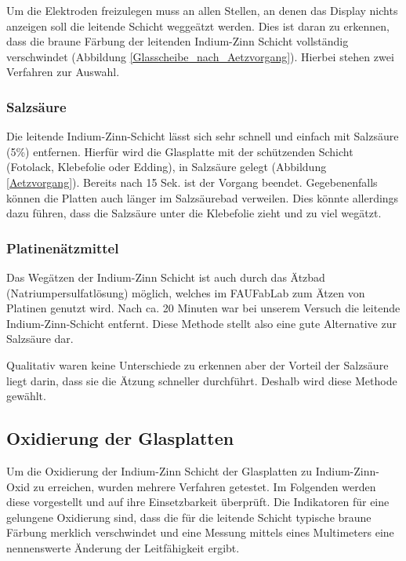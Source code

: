Um die Elektroden freizulegen muss an allen Stellen, an denen das Display nichts anzeigen soll die leitende Schicht weggeätzt werden. Dies ist daran zu erkennen, dass die braune Färbung der leitenden Indium-Zinn Schicht vollständig verschwindet (Abbildung \ref{Glasscheibe_nach_Aetzvorgang}). Hierbei stehen zwei Verfahren zur Auswahl.\\

\subsubsection*{Salzsäure}

Die leitende Indium-Zinn-Schicht lässt sich sehr schnell und einfach mit Salzsäure (5\%) entfernen. Hierfür wird die Glasplatte mit der schützenden Schicht (Fotolack, Klebefolie oder Edding), in Salzsäure gelegt (Abbildung \ref{Aetzvorgang}). Bereits nach 15 Sek. ist der Vorgang beendet. Gegebenenfalls können die Platten auch länger im Salzsäurebad verweilen. Dies könnte allerdings dazu führen, dass die Salzsäure unter die Klebefolie zieht und zu viel wegätzt.

\subsubsection*{Platinenätzmittel}
Das Wegätzen der Indium-Zinn Schicht ist auch durch das Ätzbad (Natriumpersulfatlösung) möglich, welches im FAUFabLab zum Ätzen von Platinen genutzt wird. Nach ca. 20 Minuten war bei unserem Versuch die leitende Indium-Zinn-Schicht entfernt. Diese Methode stellt also eine gute Alternative zur Salzsäure dar.

Qualitativ waren keine Unterschiede zu erkennen aber der Vorteil der Salzsäure liegt darin, dass sie die Ätzung schneller durchführt. Deshalb wird diese Methode gewählt.

\subsection{Oxidierung der Glasplatten}


Um die Oxidierung der Indium-Zinn Schicht der Glasplatten zu Indium-Zinn-Oxid zu erreichen, wurden mehrere Verfahren getestet. Im Folgenden werden diese vorgestellt und auf ihre Einsetzbarkeit überprüft.
Die Indikatoren für eine gelungene Oxidierung sind, dass die für die leitende Schicht typische braune Färbung merklich verschwindet und eine Messung mittels eines Multimeters eine nennenswerte Änderung der Leitfähigkeit ergibt.

